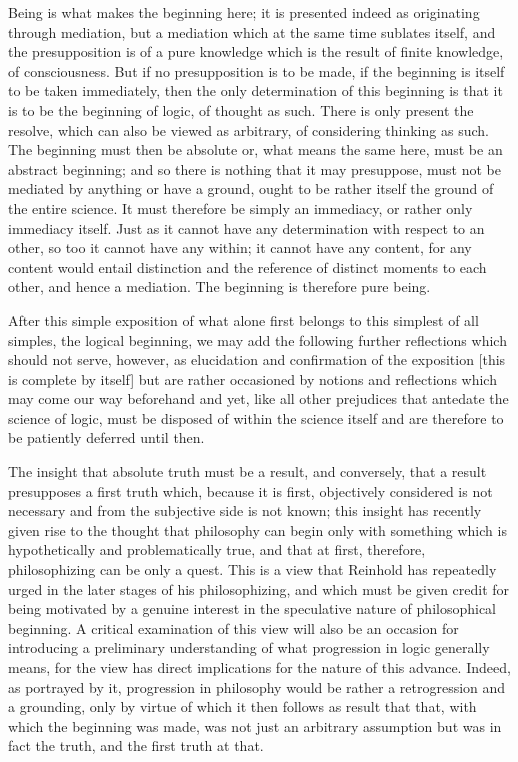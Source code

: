 Being is what makes the beginning here;
it is presented indeed as originating through mediation,
but a mediation which at the same time sublates itself,
and the presupposition is of a pure knowledge
which is the result of finite knowledge, of consciousness.
But if no presupposition is to be made,
if the beginning is itself to be taken immediately,
then the only determination of this beginning is
that it is to be the beginning of logic, of thought as such.
There is only present the resolve,
which can also be viewed as arbitrary,
of considering thinking as such.
The beginning must then be absolute
or, what means the same here, must be an abstract beginning;
and so there is nothing that it may presuppose,
must not be mediated by anything or have a ground,
ought to be rather itself the ground of the entire science.
It must therefore be simply an immediacy,
or rather only immediacy itself.
Just as it cannot have any determination with respect to an other,
so too it cannot have any within;
it cannot have any content, for any content would entail distinction
and the reference of distinct moments to each other,
and hence a mediation.
The beginning is therefore pure being.

After this simple exposition of what alone first belongs to
this simplest of all simples, the logical beginning,
we may add the following further reflections which should not serve,
however, as elucidation and confirmation of the exposition
[this is complete by itself]
but are rather occasioned by notions and reflections
which may come our way beforehand and yet,
like all other prejudices that antedate the science of logic,
must be disposed of within the science itself
and are therefore to be patiently deferred until then.

The insight that absolute truth must be a result,
and conversely, that a result presupposes a first truth
which, because it is first, objectively considered is
not necessary and from the subjective side is not known;
this insight has recently given rise to the thought
that philosophy can begin only with something
which is hypothetically and problematically true,
and that at first, therefore,
philosophizing can be only a quest.
This is a view that Reinhold has repeatedly urged
in the later stages of his philosophizing,
and which must be given credit for being
motivated by a genuine interest in
the speculative nature of philosophical beginning.
A critical examination of this view will also be
an occasion for introducing a preliminary understanding of
what progression in logic generally means,
for the view has direct implications
for the nature of this advance.
Indeed, as portrayed by it,
progression in philosophy would be
rather a retrogression and a grounding,
only by virtue of which it then follows as result that
that, with which the beginning was made,
was not just an arbitrary assumption
but was in fact the truth,
and the first truth at that.

